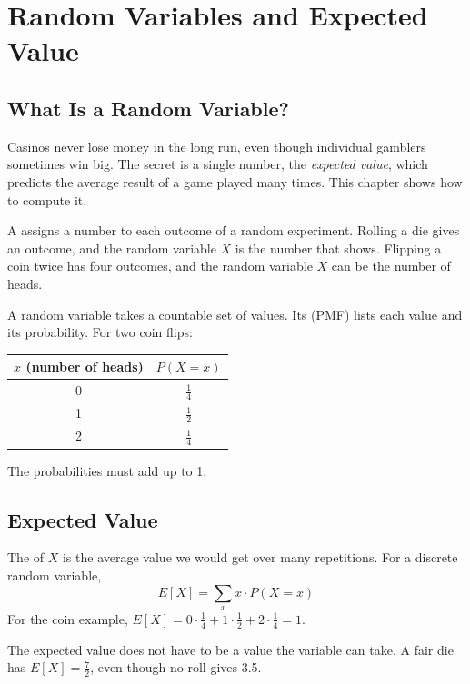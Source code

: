 \chapter{Random Variables and Expected Value}

\section{What Is a Random Variable?}
Casinos never lose money in the long run, even though individual
gamblers sometimes win big. The secret is a single number, the
\emph{expected value}, which predicts the average result of a game played
many times. This chapter shows how to compute it.

A  assigns a number to each
outcome of a random experiment. Rolling a die gives an outcome, and the random
variable $X$ is the number that shows. Flipping a coin twice has four outcomes, and
the random variable $X$ can be the number of heads.

A  random variable takes a countable set of values. Its
 (PMF) lists
each value and its probability. For two coin flips:

\begin{center}
\begin{tabular}{|c|c|}
\hline
$x$ (number of heads) & $P(X = x)$ \\
\hline
0 & $\frac{1}{4}$ \\
\hline
1 & $\frac{1}{2}$ \\
\hline
2 & $\frac{1}{4}$ \\
\hline
\end{tabular}
\end{center}

The probabilities must add up to 1.

\section{Expected Value}
The  of $X$ is the average value we would get over many
repetitions. For a discrete random variable,
$$E[X] = \sum_x x \cdot P(X = x)$$
For the coin example, $E[X] = 0 \cdot \frac{1}{4} + 1 \cdot \frac{1}{2} + 2 \cdot
\frac{1}{4} = 1$.

The expected value does not have to be a value the variable can take. A fair
die has $E[X] = \frac{7}{2}$, even though no roll gives 3.5.

